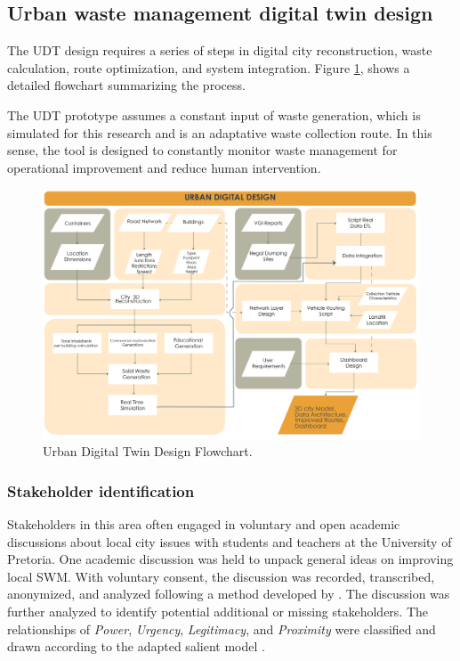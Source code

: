 \documentclass[authoryear,preprint,review,doubleblind, 12pt]{elsarticle}
\begin{document}
\subsection{Urban waste management digital twin design} \label{subsec:Phase3}
    The UDT design requires a series of steps in digital city reconstruction, waste calculation, route optimization, and system integration. Figure \ref{fig:flowchart}, shows a detailed flowchart summarizing the process.

    The UDT prototype assumes a constant input of waste generation, which is simulated for this research and is an adaptative waste collection route. In this sense, the tool is designed to constantly monitor waste management for operational improvement and reduce human intervention.
    
    \begin{figure}[!h]
    \centering
        \includegraphics[width=1.2\linewidth]{Figures/Phase III_.png}
        \caption{Urban Digital Twin Design Flowchart.}
        \label{fig:flowchart}
    \end{figure}

\subsubsection{Stakeholder identification} \label{subsec:stakeholderIdent}
   Stakeholders in this area often engaged in voluntary and open academic discussions about local city issues with students and teachers at the University of Pretoria. One academic discussion was held to unpack general ideas on improving local SWM. With voluntary consent, the discussion was recorded, transcribed, anonymized, and analyzed following a method developed by \citet{Radford2022}. The discussion was further analyzed to identify potential additional or missing stakeholders. The relationships of \textit{Power}, \textit{Urgency}, \textit{Legitimacy}, and \textit{Proximity} were classified and drawn according to the adapted salient model \citep{Mitchell1997, Shafique2022}.
\end{document}
